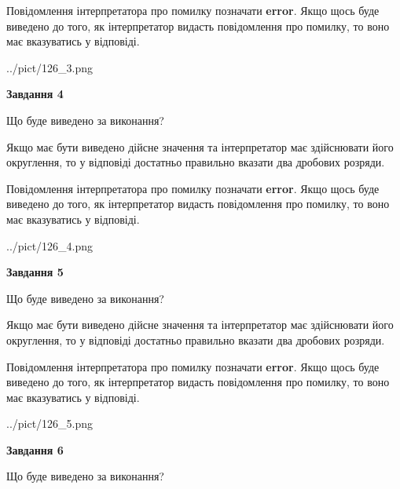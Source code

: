\documentclass[12pt, ukrainian]{article}
\begin{document}
{\begin {Large}
Повідомлення інтерпретатора про помилку позначати \textbf{error}.
Якщо щось буде виведено до того, як інтерпретатор видасть повідомлення про помилку, 
то воно має вказуватись у відповіді. \par

\begin{center}
	{../pict/126_3.png}
\end{center}
\newpage

{\begin {center}\textbf{Завдання 4}\end {center}}\par
Що буде виведено за виконання? \par

Якщо має бути виведено дійсне значення та інтерпретатор має здійснювати його округлення, 
то у відповіді достатньо правильно вказати два дробових розряди.

Повідомлення інтерпретатора про помилку позначати \textbf{error}.
Якщо щось буде виведено до того, як інтерпретатор видасть повідомлення про помилку, 
то воно має вказуватись у відповіді. \par

\begin{center}
	{../pict/126_4.png}
\end{center}
\newpage

{\begin {center}\textbf{Завдання 5}\end {center}}\par
Що буде виведено за виконання? \par

Якщо має бути виведено дійсне значення та інтерпретатор має здійснювати його округлення, 
то у відповіді достатньо правильно вказати два дробових розряди.

Повідомлення інтерпретатора про помилку позначати \textbf{error}.
Якщо щось буде виведено до того, як інтерпретатор видасть повідомлення про помилку, 
то воно має вказуватись у відповіді. \par

\begin{center}
	{../pict/126_5.png}
\end{center}
\newpage

{\begin {center}\textbf{Завдання 6}\end {center}}\par
Що буде виведено за виконання? \par


\end{Large}}
\end{document}
